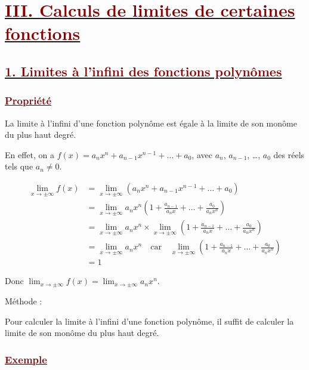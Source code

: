 \documentclass[12pt,a4paper]{article}
\begin{document}
\section*{\underline{\textcolor{darkred}{ III. Calculs de limites de certaines fonctions}}}
\subsection*{\underline{\textcolor{darkred}{ 1. Limites à l’infini des fonctions polynômes }}}
\subsubsection*{\underline{\textcolor{darkred}{ Propriété }}}

La limite à l'infini d'une fonction polynôme est égale à la limite de son monôme du plus haut degré.

\vspace{0.3cm}

\noindent En effet, on a $f(x) = a_n x^n + a_{n-1} x^{n-1} + \dots + a_0$, avec $a_n$, $a_{n-1}$, \dots, $a_0$ des réels tels que $a_n \neq 0$.

\begin{align*}
\lim_{x \to \pm\infty} f(x) &= \lim_{x \to \pm\infty} (a_n x^n + a_{n-1} x^{n-1} + \dots + a_0) \\
&= \lim_{x \to \pm\infty} a_n x^n \left(1 + \frac{a_{n-1}}{a_n x} + \dots + \frac{a_0}{a_n x^n}\right) \\
&= \lim_{x \to \pm\infty} a_n x^n \times \lim_{x \to \pm\infty} \left(1 + \frac{a_{n-1}}{a_n x} + \dots + \frac{a_0}{a_n x^n}\right) \\
&= \lim_{x \to \pm\infty} a_n x^n \quad \text{car} \quad \lim_{x \to \pm\infty} \left(1 + \frac{a_{n-1}}{a_n x} + \dots + \frac{a_0}{a_n x^n}\right) \\
&= 1
\end{align*}

\noindent Donc $\displaystyle \lim_{x \to \pm\infty} f(x) = \lim_{x \to \pm\infty} a_n x^n$.


 Méthode :

\vspace{0.1cm}

Pour calculer la limite à l'infini d'une fonction polynôme, il suffit de calculer la limite de son monôme du plus haut degré.

\vspace{0.4cm}

\subsubsection*{\underline{\textcolor{darkred}{ Exemple }}} 
\end{document}
